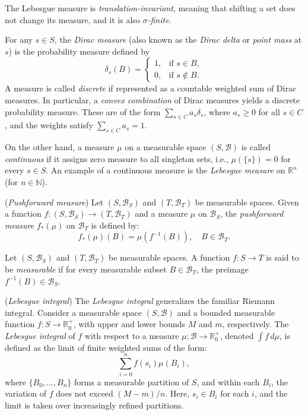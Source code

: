 The Lebesgue measure is \emph{translation-invariant}, meaning that shifting a set does not change its measure, and it is also \emph{$\sigma$-finite}.

For any $ s \in S $, the \emph{Dirac measure} (also known as the \emph{Dirac delta} or \emph{point mass} at \( s \)) is the probability measure defined by
$$
\delta_s(B) =
\begin{cases}
1, & \text{if } s \in B, \\
0, & \text{if } s \notin B.
\end{cases}
$$
A measure is called \emph{discrete} if represented as a countable weighted sum of Dirac measures. In particular, a \emph{convex combination} of Dirac measures yields a discrete probability measure. These are of the form $\sum_{s \in C} a_s \delta_s$,
where $ a_s \geq 0 $ for all $ s \in C $, and the weights satisfy $ \sum_{s \in C} a_s = 1 $.

On the other hand, a measure $ \mu $ on a measurable space $ (S, \mathcal{B}) $ is called \emph{continuous} if it assigns zero measure to all singleton sets, i.e., $ \mu(\{s\}) = 0 $ for every $ s \in S $. An example of a continuous measure is the \emph{Lebesgue measure} on $ \mathbb{R}^n $ (for $ n \in \mathbb{N} $).



\begin{definition} (\emph{Pushforward measure})
  Let $(S, \mathcal{B}_S)$ and $(T, \mathcal{B}_T)$ be measurable spaces. Given a function $f: (S, \mathcal{B}_S) \to (T, \mathcal{B}_T)$ and a measure $\mu$ on $\mathcal{B}_S$, the \emph{pushforward measure} $f_*(\mu)$ on $\mathcal{B}_T$ is defined by:
$$
f_*(\mu)(B) = \mu(f^{-1}(B)), \quad  B \in \mathcal{B}_T.
$$
\end{definition}



\begin{definition}
  Let $(S, \mathcal{B}_S)$ and $(T, \mathcal{B}_T)$ be measurable spaces. A function $f: S \to T$ is said to be \emph{measurable} if for every  measurable subset  $B \in \mathcal{B}_T$, the preimage $f^{-1}(B) \in \mathcal{B}_S$.
\end{definition}


\begin{definition} (\emph{Lebesgue integral})
  The \emph{Lebesgue integral} generalizes the familiar Riemann integral. Consider a measurable space $(S, \mathcal{B})$ and a bounded measurable function $f \colon S \to \mathbb{R}_0^+$, with upper and lower bounds $M$ and $m$, respectively. The \emph{Lebesgue integral} of $f$ with respect to a measure $\mu \colon \mathcal{B} \to \mathbb{R}_0^+$, denoted $\int f \, d\mu$, is defined as the limit of finite weighted sums of the form:
$$
\sum_{i=0}^n f(s_i) \mu(B_i),
$$
where $\{B_0, \dots, B_n\}$ forms a measurable partition of $S$, and within each $B_i$, the variation of $f$ does not exceed $(M - m)/n$. Here, $s_i \in B_i$ for each $i$, and the limit is taken over increasingly refined partitions. 
\end{definition}


